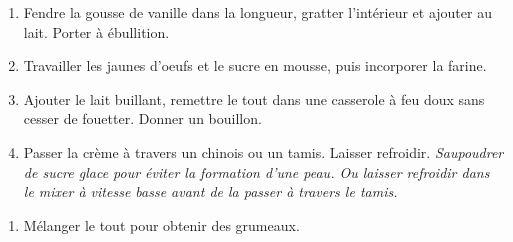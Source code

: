 \begin{recipe}
  \begin{enumerate}

  \item Fendre la gousse de vanille dans la longueur, gratter
    l'intérieur et ajouter au lait.  Porter à ébullition.

  \item Travailler les jaunes d'oeufs et le sucre en mousse, puis
    incorporer la farine.

  \item Ajouter le lait buillant, remettre le tout dans une casserole
    à feu doux sans cesser de fouetter.  Donner un bouillon.

  \item Passer la crème à travers un chinois ou un tamis.  Laisser
    refroidir.  {\it Saupoudrer de sucre glace pour éviter la formation
    d'une peau.  Ou laisser refroidir dans le mixer à vitesse basse
    avant de la passer à travers le tamis.}

  \end{enumerate}
\end{recipe}


\begin{ingredients}
\end{ingredients}


\begin{recipe}
  \begin{enumerate}

  \item Mélanger le tout pour obtenir des grumeaux.

  \end{enumerate}
\end{recipe}


\begin{ingredients}
\end{ingredients}

